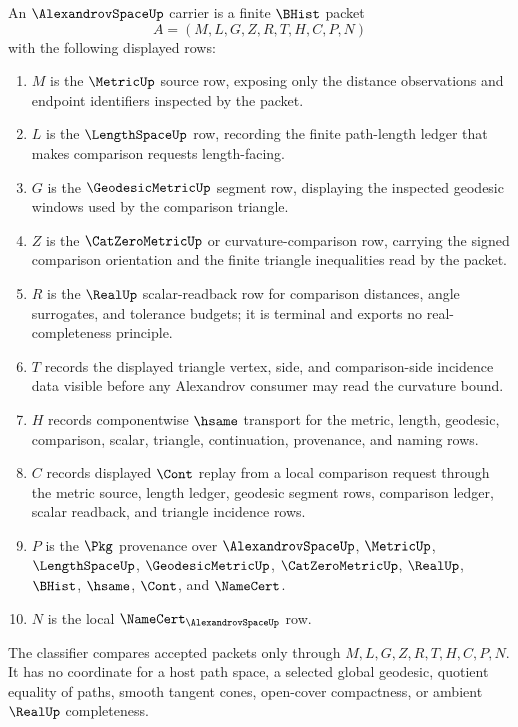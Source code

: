 \begin{definition}
\label{def:alexandrov-space-carrier}
An $\AlexandrovSpaceUp$ carrier is a finite $\BHist$ packet
$$
A=(M,L,G,Z,R,T,H,C,P,N)
$$
with the following displayed rows:
\begin{enumerate}
\item $M$ is the $\MetricUp$ source row, exposing only the distance observations and endpoint identifiers inspected by the packet.
\item $L$ is the $\LengthSpaceUp$ row, recording the finite path-length ledger that makes comparison requests length-facing.
\item $G$ is the $\GeodesicMetricUp$ segment row, displaying the inspected geodesic windows used by the comparison triangle.
\item $Z$ is the $\CatZeroMetricUp$ or curvature-comparison row, carrying the signed comparison orientation and the finite triangle inequalities read by the packet.
\item $R$ is the $\RealUp$ scalar-readback row for comparison distances, angle surrogates, and tolerance budgets; it is terminal and exports no real-completeness principle.
\item $T$ records the displayed triangle vertex, side, and comparison-side incidence data visible before any Alexandrov consumer may read the curvature bound.
\item $H$ records componentwise $\hsame$ transport for the metric, length, geodesic, comparison, scalar, triangle, continuation, provenance, and naming rows.
\item $C$ records displayed $\Cont$ replay from a local comparison request through the metric source, length ledger, geodesic segment rows, comparison ledger, scalar readback, and triangle incidence rows.
\item $P$ is the $\Pkg$ provenance over $\AlexandrovSpaceUp$, $\MetricUp$, $\LengthSpaceUp$, $\GeodesicMetricUp$, $\CatZeroMetricUp$, $\RealUp$, $\BHist$, $\hsame$, $\Cont$, and $\NameCert$.
\item $N$ is the local $\NameCert_{\AlexandrovSpaceUp}$ row.
\end{enumerate}
The classifier compares accepted packets only through $M,L,G,Z,R,T,H,C,P,N$. It has no coordinate for a host path space, a selected global geodesic, quotient equality of paths, smooth tangent cones, open-cover compactness, or ambient $\RealUp$ completeness.
\end{definition}

